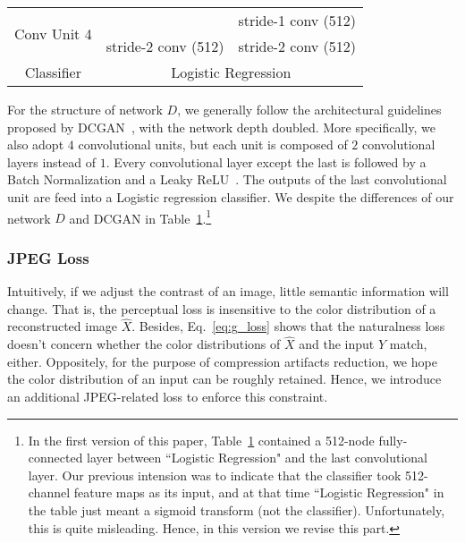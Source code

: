 \documentclass[10pt,twocolumn,letterpaper]{article}
\begin{document}
\begin{table}
\begin{center}
{\begin{tabular}{c|c|c}
\hline
\multirow{2}{*}{Conv Unit 4}&                     & stride-1 conv (512)\\
                            & stride-2 conv (512) & stride-2 conv (512)\\
\hline
Classifier                  & \multicolumn{2}{c}{Logistic Regression}\\
\hline
\end{tabular}
\label{tb:d}
}
\end{center}
\vspace{-1.5em}
\end{table}

For the structure of network $D$, we generally follow the architectural guidelines proposed by DCGAN~\cite{dcgan}, with the network depth doubled. More specifically, we also adopt $4$ convolutional units, but each unit is composed of $2$ convolutional layers instead of $1$. Every convolutional layer except the last is followed by a Batch Normalization and a Leaky ReLU~\cite{lrelu}. The outputs of the last convolutional unit are feed into a Logistic regression classifier. We despite the differences of our network $D$ and DCGAN in Table~\ref{tb:d}.\footnote{In the first version of this paper, Table~\ref{tb:d} contained a 512-node fully-connected layer between ``Logistic Regression" and the last convolutional layer. Our previous intension was to indicate that the classifier took 512-channel feature maps as its input, and at that time ``Logistic Regression" in the table just meant a sigmoid transform (not the classifier). Unfortunately, this is quite misleading. Hence, in this version we revise this part.}

\subsubsection{JPEG Loss}
Intuitively, if we adjust the contrast of an image, little semantic information will change. That is, the perceptual loss is insensitive to the color distribution of a reconstructed image $\hat{X}$. Besides, Eq.~\eqref{eq:g_loss} shows that the naturalness loss doesn't concern whether the color distributions of $\hat{X}$ and the input $Y$ match, either. Oppositely, for the purpose of compression artifacts reduction, we hope the color distribution of an input can be roughly retained. Hence, we introduce an additional JPEG-related loss to enforce this constraint.
\end{document}
